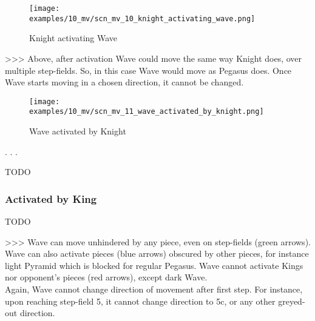 \vspace*{-1.4\baselineskip}
\noindent
\begin{figure}[h]
\texttt{[image: examples/10\_mv/scn\_mv\_10\_knight\_activating\_wave.png]}
\caption{Knight activating Wave}
\label{fig:scn_mv_10_knight_activating_wave}
\end{figure}

\textgreater \textgreater \textgreater
Above, after activation Wave could move the same way Knight does, over multiple
step-fields. So, in this case Wave would move as Pegasus does. Once Wave starts
moving in a chosen direction, it cannot be changed.

\clearpage %

\vspace*{-2.1\baselineskip}
\noindent
\begin{figure}[!h]
\texttt{[image: examples/10\_mv/scn\_mv\_11\_wave\_activated\_by\_knight.png]}
\caption{Wave activated by Knight}
\label{fig:scn_mv_11_wave_activated_by_knight}
\end{figure}

. . .

\huge
TODO
\normalsize

\clearpage %

\subsubsection*{Activated by King}

\huge
TODO
\normalsize

\clearpage %

\textgreater \textgreater \textgreater
Wave can move unhindered by any piece, even on step-fields (green arrows). Wave
can also activate pieces (blue arrows) obscured by other pieces, for instance
light Pyramid which is blocked for regular Pegasus. Wave cannot activate Kings
nor opponent's pieces (red arrows), except dark Wave. \\
Again, Wave cannot change direction of movement after first step. For instance,
upon reaching step-field 5, it cannot change direction to 5c, or any other
greyed-out direction.

